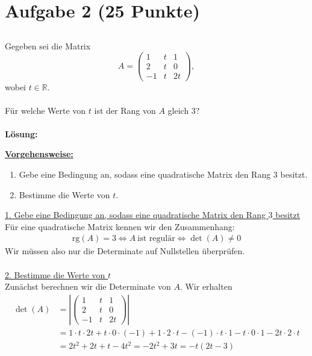 \section*{Aufgabe 2 (25 Punkte)}
\vspace{0.4cm}
\subsection*{}
Gegeben sei die Matrix
\begin{equation*}
A = 
\begin{pmatrix}
1 & t & 1 \\
2 & t & 0 \\
-1 & t & 2t
\end{pmatrix},
\end{equation*}
wobei $t \in \mathbb{R}$.
\\
\\
Für welche Werte von $t$ ist der Rang von $A$ gleich $3$?
\\
\\
\textbf{Lösung:}
\begin{mdframed}
\renewcommand{\labelenumi}{\theenumi.}
\underline{\textbf{Vorgehensweise:}}
\begin{enumerate}
\item Gebe eine Bedingung an, sodass eine quadratische Matrix den Rang $3$ besitzt.
\item Bestimme die Werte von $t$.
\end{enumerate}
\end{mdframed}
\underline{1. Gebe eine Bedingung an, sodass eine quadratische Matrix den Rang $3$ besitzt}\\
Für eine quadratische Matrix kennen wir den Zusammenhang:
\begin{align*}
\text{rg}(A) = 3 
\Leftrightarrow
A \ \text{ist regulär}
\Leftrightarrow
\det(A) \neq 0
\end{align*}
Wir müssen also nur die Determinate auf Nullstellen überprüfen.\\
\\
\underline{2. Bestimme die Werte von $t$}\\
Zunächst berechnen wir die Determinate von $A$.
Wir erhalten 
\begin{equation*}
\begin{split}
\det(A)
&= 
\left| 
\begin{pmatrix}
1 & t & 1 \\
2 & t & 0 \\
-1 & t & 2t
\end{pmatrix}
\right|\\
&=
1 \cdot t \cdot 2t +t \cdot 0 \cdot (-1) + 1 \cdot 2 \cdot t 
- (-1) \cdot t \cdot 1 - t \cdot 0  \cdot 1 - 2t \cdot 2 \cdot t\\
&=
2 t^2 + 2t + t - 4 t^2 
= -2 t^2 +3 t = -t ( 2 t - 3)
\end{split}
\end{equation*}
